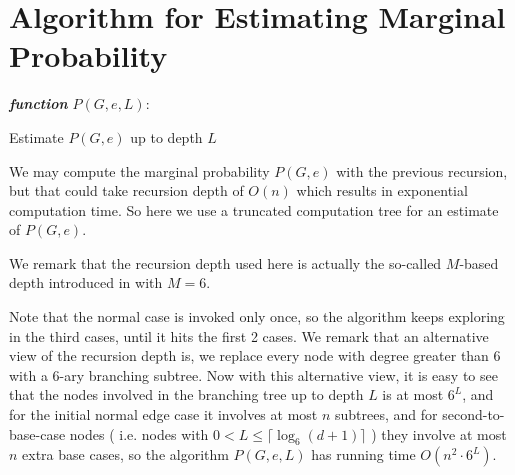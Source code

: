 
\section{Algorithm for Estimating Marginal Probability}

\IncMargin{1em}
\begin{algorithm}[H]
\emph{ \textbf{function} $P(G, e, L):$}
\BlankLine
{}
 \caption{Estimate $P(G,e)$ up to depth $L$}
\end{algorithm}
\DecMargin{1em}

We may compute the marginal probability $P(G, e)$ with the previous recursion, but
that could take recursion depth of $O(n)$ which results in exponential computation time.
So here we use a truncated computation tree for an estimate of $P(G,e)$.

We remark that the recursion depth used here is actually the so-called $M$-based depth introduced in \cite{LLY12} with $M=6$. 


Note that the normal case is invoked only once, so the algorithm keeps exploring in the third cases, until it hits the first 2 cases. We remark that an alternative view of the recursion depth is, we replace every node with degree greater than 6 with a $6$-ary branching subtree.
Now with this alternative view, it is easy to see that the nodes involved in the branching tree up to depth $L$ is at most $6^L$,
and for the initial normal edge case it involves at most $n$ subtrees, and for second-to-base-case nodes ( i.e. nodes with $0<L \leq \lceil \log_6{(d+1)} \rceil $ ) they involve at most $n$ extra base cases, 
so the algorithm $P(G,e,L)$ has running time $O(n^2 \cdot 6^L)$.
%

